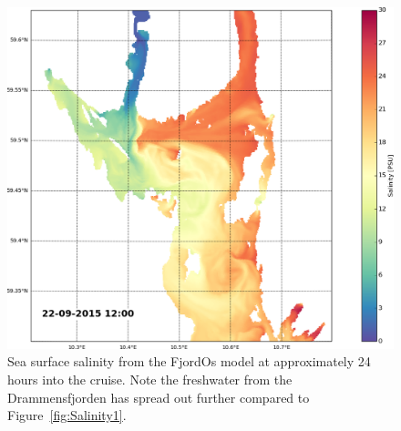 \documentclass[12pt,a4paper,english]{article}
\begin{document}
\begin{figure}[ht]
\centerline{
\includegraphics*[width=1.0\textwidth]{Python/salthold_96}}
\caption{\small
Sea surface salinity from the FjordOs model at approximately 24 hours into the cruise. Note the freshwater from the Drammensfjorden has spread out further compared to Figure~\ref{fig:Salinity1}.
}
\label{fig:Salinity2}
\end{figure}
\end{document}
